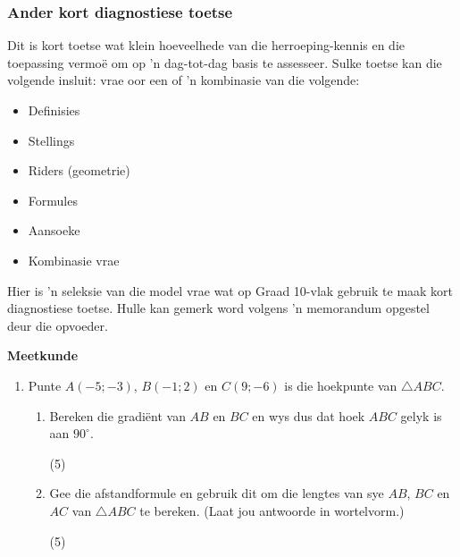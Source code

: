 \subsubsection{Ander kort diagnostiese toetse}
Dit is kort toetse wat klein hoeveelhede van die herroeping-kennis en die toepassing vermo\"{e} om op 'n dag-tot-dag basis te assesseer. Sulke toetse kan die volgende insluit: vrae oor een of 'n kombinasie van die volgende:
\begin{itemize}[noitemsep]
\item
  Definisies
\item
  Stellings
\item
  Riders (geometrie)
\item
  Formules
\item
  Aansoeke
\item
  Kombinasie vrae
\end{itemize}
Hier is 'n seleksie van die model vrae wat op Graad 10-vlak gebruik te maak kort diagnostiese toetse. Hulle kan gemerk word volgens 'n memorandum opgestel deur die opvoeder.

\textbf{Meetkunde}
\begin{enumerate}[itemsep=0pt, label=\textbf{\arabic*}. ] 
\item Punte $A(-5; -3)$, $B(-1; 2)$ en $C(9; -6)$ is die hoekpunte van $\triangle ABC$. 
\begin{enumerate}[itemsep=0pt,label=\textbf{(\alph*)}]
\item Bereken die gradi\"{e}nt van $AB$ en $BC$ en wys dus dat hoek $ABC$ gelyk is aan $90^{\circ}$.				
\begin{flushright}(5)\end{flushright}
\item Gee die afstandformule en gebruik dit om die lengtes van sye
$AB$, $BC$ en $AC$ van $\triangle ABC$ te bereken. (Laat jou antwoorde in wortelvorm.)
\begin{flushright}(5)\end{flushright}
\end{enumerate}
\end{enumerate}

